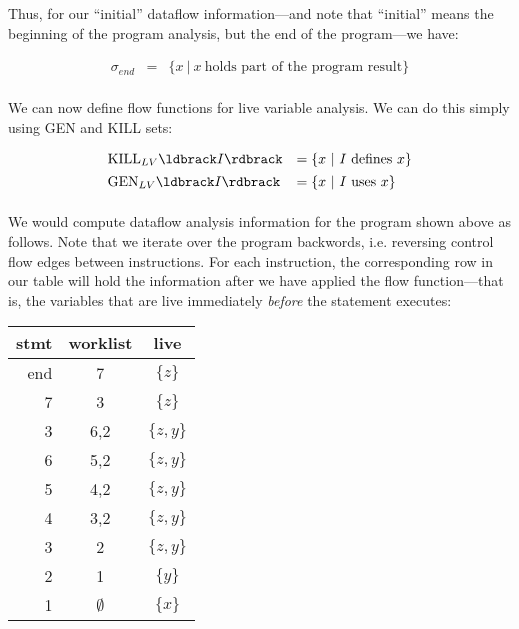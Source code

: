 \documentclass[11pt]{article}
\begin{document}
Thus, for our ``initial'' dataflow information---and note that ``initial'' means the beginning of the program analysis, but the end of the program---we have:

\[
\begin{array}{ccl}

\sigma_{end} & = & \{ x ~|~ x ~\mbox{holds part of the program result}\}\\

\end{array}
\]

We can now define flow functions for live variable analysis.  We can do this simply using GEN and KILL sets:

\[
\begin{array}{lll}

\mbox{KILL}_{LV}\parg{I} & = \{ x ~|~ I ~\mbox{defines}~x \}\\[1ex]

\mbox{GEN}_{LV}\parg{I}  & = \{ x ~|~ I ~\mbox{uses}~x \}\\[1ex]

\end{array}
\]

We would compute dataflow analysis information for the program shown above as follows.  Note that we iterate over the program backwords, i.e. reversing control flow edges between instructions.  For each instruction, the corresponding row in our table will hold the information after we have applied the flow function---that is, the variables that are live immediately \textit{before} the statement executes:

\tablespace
\begin{tabular}{r | c | c}

stmt & worklist & live \\
\hline
end & 7   & $\{ z \}$ \\
7   & 3   & $\{ z \}$ \\
3   & 6,2 & $\{ z, y \}$ \\
6   & 5,2 & $\{ z, y \}$ \\
5   & 4,2 & $\{ z, y \}$ \\
4   & 3,2 & $\{ z, y \}$ \\
3   & 2   & $\{ z, y \}$ \\
2   & 1   & $\{ y \}$ \\
1   & $\emptyset$ & $\{ x \}$ \\

\end{tabular}
\tablespace
\end{document}
